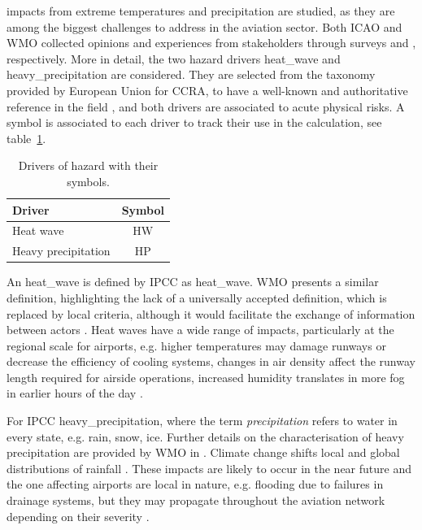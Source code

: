 \Glspl{impact} from extreme temperatures and precipitation are studied, as they are among the biggest challenges to address in the aviation sector. Both \Gls{ICAO} and \gls{WMO} collected opinions and experiences from stakeholders through surveys \cite[62]{2018ICAOClimateAdaptation} and \cite[34]{2020WorldMeteorologicalOrganizationWMOOutcomesOf}, respectively.
More in detail, the two \gls{hazard} \glspl{driver} \gls{heat_wave} and \gls{heavy_precipitation} are considered. They are selected from the taxonomy provided by European Union for \gls{CCRA}, to have a well-known and authoritative reference in the field \cite[177]{2024EU20212139}, and both drivers are associated to acute physical risks. A symbol is associated to each \gls{driver} to track their use in the calculation, see table~\ref{tab:drivers_hazard}.
\begin{table}[h]
  \centering
  \caption{Drivers of hazard with their symbols.}
  \label{tab:drivers_hazard}
  \begin{tabular}{lc}
    Driver              & Symbol        \\
    \hline
    Heat wave           & $\mathrm{HW}$ \\
    Heavy precipitation & $\mathrm{HP}$ \\
  \end{tabular}
\end{table}

An \gls{heat_wave} is defined by \gls{IPCC} as \glsdesc{heat_wave}. \Gls{WMO} presents a similar definition, highlighting the lack of a universally accepted definition, which is replaced by local criteria, although it would facilitate the exchange of information between actors \cite[5]{2023WorldMeteorologicalOrganizationWMOGuidelinesOn}. Heat waves have a wide range of impacts, particularly at the regional scale for airports, e.g. higher temperatures may damage runways or decrease the efficiency of cooling systems, changes in air density affect the runway length required for airside operations, increased humidity translates in more fog in earlier hours of the day \cite[23-28]{2018ICAOClimateAdaptation}.

For \gls{IPCC} \glsdesc{heavy_precipitation}, where the term \emph{precipitation} refers to water in every state, e.g. rain, snow, ice. Further details on the characterisation of heavy precipitation are provided by \gls{WMO} in \cite[6-7]{2023WorldMeteorologicalOrganizationWMOGuidelinesOn}. Climate change shifts local and global distributions of rainfall \cite[1605]{2021SeneviratneWeatherAnd}. These impacts are likely to occur in the near future and the one affecting airports are local in nature, e.g. flooding due to failures in drainage systems, but they may propagate throughout the aviation network depending on their severity \cite[28-34]{2018ICAOClimateAdaptation}.

